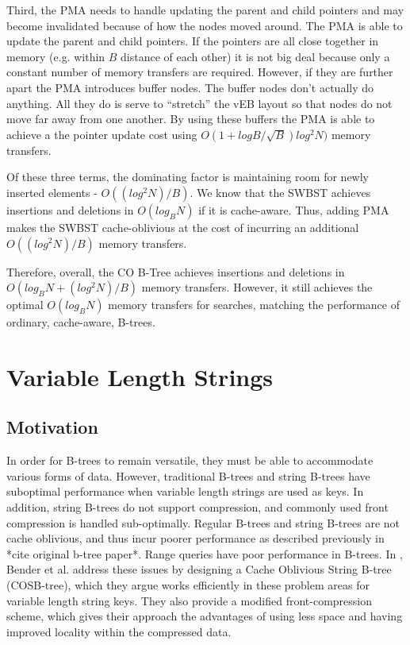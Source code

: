 \documentclass{style}
\begin{document}
Third, the PMA needs to handle updating the parent and child pointers and may
become invalidated because of how the nodes moved around. The PMA is able to
update the parent and child pointers. If the pointers are all close together
in memory (e.g. within $B$ distance of each other) it is not big deal because
only a constant number of memory transfers are required. However, if they are
further apart the PMA introduces buffer nodes. The buffer nodes don't actually
do anything. All they do is serve to ``stretch'' the vEB layout so that nodes
do not move far away from one another. By using these buffers the PMA is able
to achieve a the pointer update cost using $O(1+ logB / \sqrt{B}) log^2 N)$
memory transfers.

Of these three terms, the dominating factor is maintaining room for newly
inserted elements - $O((log^2N)/B)$. We know that the SWBST achieves insertions and
deletions in $O(log_B N)$ if it is cache-aware. Thus, adding PMA makes
the SWBST cache-oblivious at the cost of incurring an additional $O((log^2N)/B)$ memory
transfers.

Therefore, overall, the CO B-Tree achieves insertions and deletions in 
$O(log_B N + (log^2N)/B)$ memory transfers. However, it still achieves the optimal
$O(log_B N)$ memory transfers for searches, matching the performance of
ordinary, cache-aware, B-trees.

\section{Variable Length Strings}

\subsection{Motivation}
In order for B-trees to remain versatile, they must be able to accommodate various forms of data. However, traditional B-trees and string B-trees have suboptimal performance when variable length strings are used as keys. In addition, string B-trees do not support compression, and commonly used front compression is handled sub-optimally. Regular B-trees and string B-trees are not cache oblivious, and thus incur poorer performance as described previously in *cite original b-tree paper*. Range queries have poor performance in B-trees. In \cite{BenderFaKu06}, Bender et al. address these issues by designing a Cache Oblivious String B-tree (COSB-tree), which they argue works efficiently in these problem areas for variable length string keys. They also provide a modified front-compression scheme, which gives their approach the advantages of using less space and having improved locality within the compressed data.
\end{document}

